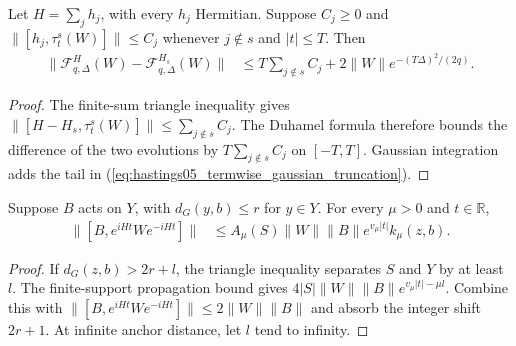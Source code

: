 \begin{lemma}
    \label{thm:hastings05_termwise_gaussian_truncation}
    \leanok
    Let $H=\sum_jh_j$, with every $h_j$ Hermitian. Suppose $C_j\ge0$ and
    $\|[h_j,\tau_t^s(W)]\|\le C_j$ whenever $j\notin s$ and $|t|\le T$.
    Then
    \begin{align}
        \|\mathcal F_{q,\Delta}^{H}(W)-\mathcal F_{q,\Delta}^{H_s}(W)\|
         & \le T\sum_{j\notin s}C_j
        +2\|W\|e^{-(T\Delta)^2/(2q)}.
        \label{eq:hastings05_termwise_gaussian_truncation}
    \end{align}
\end{lemma}
\begin{proof}\leanok
    The finite-sum triangle inequality gives
    $\|[H-H_s,\tau_t^s(W)]\|\le\sum_{j\notin s}C_j$.
    The Duhamel formula therefore bounds the difference of the two
    evolutions by $T\sum_{j\notin s}C_j$ on $[-T,T]$.
    Gaussian integration adds the tail in
    (\ref{eq:hastings05_termwise_gaussian_truncation}).
\end{proof}

\begin{lemma}
    \label{thm:hastings05_anchor_lr}
    \leanok
    Suppose $B$ acts on $Y$, with $d_G(y,b)\le r$ for $y\in Y$.
    For every $\mu>0$ and $t\in\mathbb R$,
    \begin{align}
        \|[B,e^{iHt}We^{-iHt}]\|
         & \le A_\mu(S)\|W\|\|B\|e^{v_\mu|t|}k_\mu(z,b).
        \label{eq:hastings05_anchor_lr}
    \end{align}
\end{lemma}
\begin{proof}\leanok
    If $d_G(z,b)>2r+l$, the triangle inequality separates $S$ and $Y$
    by at least $l$. The finite-support propagation bound gives
    $4|S|\|W\|\|B\|e^{v_\mu|t|-\mu l}$. Combine this with
    $\|[B,e^{iHt}We^{-iHt}]\|\le2\|W\|\|B\|$ and absorb the integer
    shift $2r+1$. At infinite anchor distance, let $l$ tend to infinity.
\end{proof}

